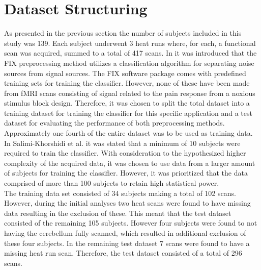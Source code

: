 \section{Dataset Structuring}

As presented in the previous section the number of subjects included in this study was 139. Each subject underwent 3 heat runs where, for each, a functional scan was acquired, summed to a total of 417 scans. In  it was introduced that the FIX preprocessing method utilizes a classification algorithm for separating noise sources from signal sources. The FIX software package comes with predefined training sets for training the classifier. However, none of these have been made from fMRI scans consisting of signal related to the pain response from a noxious stimulus block design. Therefore, it was chosen to split the total dataset into a training dataset for training the classifier for this specific application and a test dataset for evaluating the performance of both preprocessing methods. \\
Approximately one fourth of the entire dataset was to be used as training data. In Salimi-Khorshidi et al. \cite{Salimi-Khorshidi2014} it was stated that a minimum of 10 subjects were required to train the classifier. With consideration to the hypothesized higher complexity of the acquired data, it was chosen to use data from a larger amount of subjects for training the classifier. However, it was prioritized that the data comprised of more than 100 subjects to retain high statistical power.\\
The training data set consisted of 34 subjects making a total of 102 scans. However, during the initial analyses two heat scans were found to have missing data resulting in the exclusion of these. This meant that the test dataset consisted of the remaining 105 subjects. However four subjects were found to not having the cerebellum fully scanned, which resulted in additional exclusion of these four subjects. In the remaining test dataset 7 scans were found to have a missing heat run scan.  Therefore, the test dataset consisted of a total of 296 scans.  \\

%
